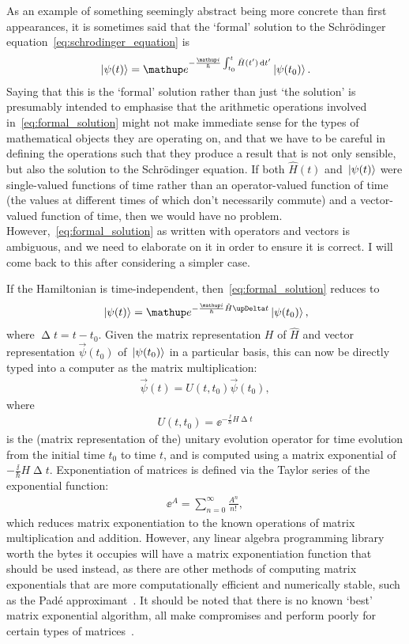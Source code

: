 As an example of something seemingly abstract being more concrete than first appearances, it is sometimes said that the `formal' solution to the Schr\"odinger equation~\eqref{eq:schrodinger_equation} is
\begin{align}\label{eq:formal_solution}
\ket{\psi(t)} = \ee^{-\frac \ii \hbar \int_{t_0}^t \hat H(t^\prime)\,\dd t^\prime}\ket{\psi(t_0)}.
\end{align}
Saying that this is the `formal' solution rather than just `the solution' is presumably intended to emphasise that the arithmetic operations involved in~\eqref{eq:formal_solution} might not make immediate sense for the types of mathematical objects they are operating on, and that we have to be careful in defining the operations such that they produce a result that is not only sensible, but also the solution to the Schr\"odinger equation. If both $\hat H(t)$ and $\ket{\psi(t)}$ were single-valued functions of time rather than an operator-valued function of time (the values at different times of which don't necessarily commute) and a vector-valued function of time, then we would have no problem. However,~\eqref{eq:formal_solution} as written with operators and vectors is ambiguous, and we need to elaborate on it in order to ensure it is correct. I will come back to this after considering a simpler case.

If the Hamiltonian is time-independent, then~\eqref{eq:formal_solution} reduces to
\begin{align}
\ket{\psi(t)} = \ee^{-\frac \ii \hbar\hat H\upDelta t}\ket{\psi(t_0)},
\end{align}
where $\upDelta t = t - t_0$.
Given the matrix representation $H$ of $\hat H$ and vector representation $\vec \psi(t_0)$ of $\ket{\psi(t_0)}$ in a particular basis, this can now be directly typed into a computer as the matrix multiplication:
\begin{align}\label{eq:unitary_time_independent}
\vec \psi(t) = U(t, t_0)\vec \psi(t_0),
\end{align}
where
\begin{align}
U(t, t_0) = \ee^{-\frac \ii \hbar H \upDelta t}
\end{align}
is the (matrix representation of the) unitary evolution operator for time evolution from the initial time $t_0$ to time $t$, and is computed using a matrix exponential of $-\frac \ii \hbar H \upDelta t$. Exponentiation of matrices is defined via the Taylor series of the exponential function:
\begin{align}
\ee^A = \sum_{n=0}^\infty \frac{A^n}{n!},
\end{align}
which reduces matrix exponentiation to the known operations of matrix multiplication and addition. However, any linear algebra programming library worth the bytes it occupies will have a matrix exponentiation function that should be used instead, as there are other methods of computing matrix exponentials that are more computationally efficient and numerically stable, such as the Pad\'e approximant~\cite{brezinski_extrapolation_1996}. It should be noted that there is no known `best' matrix exponential algorithm, all make compromises and perform poorly for certain types of matrices~\cite{moler_nineteen_2003}.

